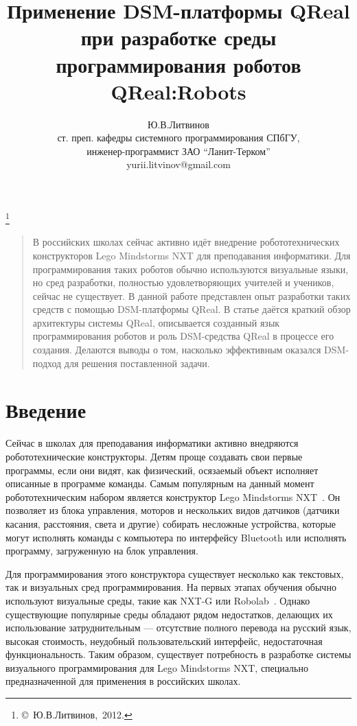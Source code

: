 \documentclass[a4paper]{article}
\title{Применение DSM-платформы QReal при разработке среды программирования роботов QReal:Robots}
\author{Ю.В.Литвинов \\ ст. преп. кафедры системного программирования СПбГУ, \\ инженер-программист ЗАО ``Ланит-Терком'' \\ yurii.litvinov@gmail.com}
\date{}
\begin{document}
\maketitle
\thispagestyle{empty}

\renewcommand{\thefootnote}{}
\footnote{\small{\copyright~Ю.В.Литвинов,~2012.}}
\renewcommand{\thefootnote}{\arabic{footnote}}
\setcounter{footnote}{0}

\begin{quote}
\small\noindent
В российских школах сейчас активно идёт внедрение робототехнических конструкторов Lego Mindstorms NXT для преподавания информатики. Для программирования таких роботов обычно используются визуальные языки, но сред разработки, полностью удовлетворяющих  учителей и учеников, сейчас не существует. В данной работе представлен опыт разработки таких средств с помощью DSM-платформы QReal. В статье даётся краткий обзор архитектуры системы QReal, описывается созданный язык программирования роботов и роль DSM-средства QReal в процессе его создания. Делаются выводы о том, насколько эффективным оказался DSM-подход для решения поставленной задачи.
\end{quote}

\section*{Введение}
Сейчас в школах для преподавания информатики активно внедряются робототехнические конструкторы. Детям проще создавать свои первые программы, если они видят, как физический, осязаемый объект исполняет описанные в программе команды. Самым популярным на данный момент робототехническим набором является конструктор Lego Mindstorms NXT~\cite{legoNxt}. Он позволяет из блока управления, моторов и нескольких видов датчиков (датчики касания, расстояния, света и другие) собирать несложные устройства, которые могут исполнять команды с компьютера по интерфейсу Bluetooth или исполнять программу, загруженную на блок управления.

Для программирования этого конструктора существует несколько как текстовых, так и визуальных сред программирования. На первых этапах обучения обычно используют визуальные среды, такие как NXT-G или Robolab~\cite{robolabHome}. Однако существующие популярные среды обладают рядом недостатков, делающих их использование затруднительным --- отсутствие полного перевода на русский язык, высокая стоимость, неудобный пользовательский интерфейс, недостаточная функциональность. Таким образом, существует потребность в разработке системы визуального программирования для Lego Mindstorms NXT, специально предназначенной для применения в российских школах.
\end{document}
